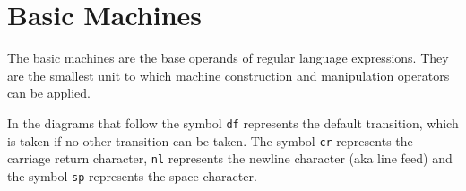 \documentclass[letterpaper,11pt,oneside]{book}
\begin{document}



\section{Basic Machines}
\label{basic}

The basic machines are the base operands of regular language expressions. They
are the smallest unit to which machine construction and manipulation operators
can be applied.

In the diagrams that follow the symbol \verb|df| represents
the default transition, which is taken if no other transition can be taken. The
symbol \verb|cr| represents the carriage return character, \verb|nl| represents the newline character (aka line feed) and the symbol
\verb|sp| represents the space character.
\end{document}

